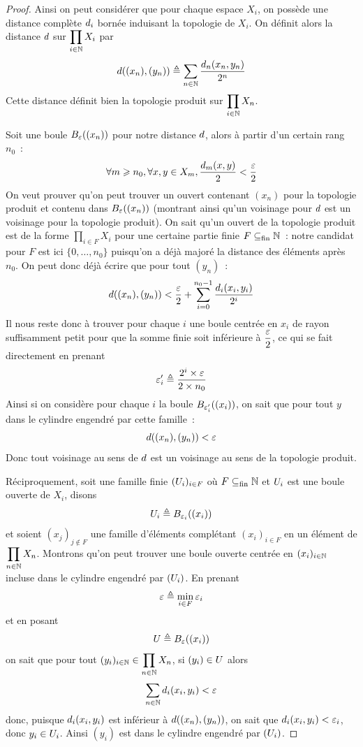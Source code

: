 \begin{proof}
  Ainsi on peut considérer que pour chaque espace $X_i$, on possède une
  distance complète $\vardis_i$ bornée induisant la topologie de $X_i$. On
  définit alors la distance $\vardis$ sur $\displaystyle\prod_{i\in\bN} X_i$ par
  \[\vardis((x_n),(y_n)) \defeq \sum_{n \in \bN} \frac{\vardis_n(x_n,y_n)}{2^n}\]
  Cette distance définit bien la topologie produit sur
  $\displaystyle\prod_{i\in\bN} X_n$.

  Soit une boule $\boule{(x_n)}{\vareps}$ pour notre distance $\vardis$, alors à
  partir d'un certain rang $n_0$~:
  \[\forall m \geq n_0, \forall x,y \in X_m,
  \frac{\vardis_m(x,y)}{2} < \frac{\vareps}{2}\]
  On veut prouver qu'on peut trouver un ouvert contenant $(x_n)$ pour la
  topologie produit et contenu dans $\boule{(x_n)}{\vareps}$ (montrant ainsi
  qu'un voisinage pour $\vardis$ est un voisinage pour la topologie produit). On
  sait qu'un ouvert de la topologie produit est de la forme
  $\displaystyle\prod_{i \in F} X_i$ pour une certaine partie finie
  $F\subfin \bN$~: notre candidat pour $F$ est ici $\{0,\ldots,n_0\}$
  puisqu'on a déjà majoré la distance des éléments après $n_0$. On peut donc
  déjà écrire que pour tout $(y_n)$~:
  \[\vardis((x_n),(y_n)) < \frac{\vareps}{2} +
  \sum_{i = 0}^{n_0 - 1} \frac{\vardis_i(x_i,y_i)}{2^i}\]
  Il nous reste donc à trouver pour chaque $i$ une boule centrée en
  $x_i$ de rayon suffisamment petit pour que la somme finie soit inférieure à
  $\dfrac{\vareps}{2}$, ce qui se fait directement en prenant
  \[\vareps'_i \defeq \frac{2^i\times \vareps}{2 \times n_0}\]
  Ainsi si on considère pour chaque $i$ la boule $\boule{(x_i)}{\vareps'_i}$, on
  sait que pour tout $y$ dans le cylindre engendré par cette famille~:
  \[\vardis((x_n),(y_n)) < \vareps\]
  Donc tout voisinage au sens de $\vardis$ est un voisinage au sens de la
  topologie produit.

  Réciproquement, soit une famille finie $(\varOp_i)_{i \in F}$ où
  $F \subfin \bN$ et $\varOp_i$ est une boule ouverte de $X_i$, disons
  \[\varOp_i \defeq \boule{(x_i)}{\vareps_i}\]
  et soient $(x_j)_{j \notin F}$ une famille d'éléments complétant
  $(x_i)_{i \in F}$
  en un élément de $\displaystyle\prod_{n \in \bN} X_n$. Montrons qu'on peut
  trouver une boule ouverte centrée en $(x_i)_{i \in \bN}$ incluse dans le
  cylindre engendré par $(\varOp_i)$. En prenant
  \[\vareps \defeq \min_{i \in F} \vareps_i\]
  et en posant
  \[\varOp \defeq \boule{(x_i)}{\vareps}\]
  on sait que pour tout
  $\displaystyle (y_i)_{i \in \bN} \in \prod_{n \in \bN} X_n$,
  si $(y_i) \in \varOp$ alors
  \[\sum_{n \in \bN} \vardis_i(x_i,y_i) < \vareps\]
  donc, puisque $\vardis_i(x_i,y_i)$ est inférieur à $\vardis((x_n),(y_n))$, on
  sait que $\vardis_i(x_i,y_i) < \vareps_i$, donc $y_i \in \varOp_i$. Ainsi
  $(y_i)$ est dans le cylindre engendré par $(\varOp_i)$.


\end{proof}
